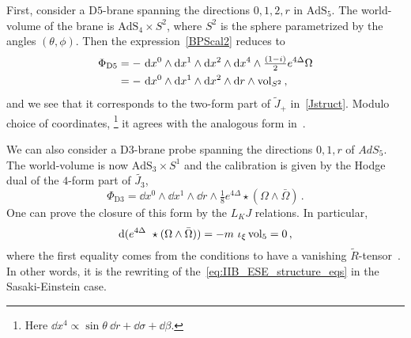 \documentclass[debug]{phd}
\begin{document}
First, consider a D$5$-brane spanning the directions $0,1,2, r$ in $\mathrm{AdS}_5$. 
The world-volume of the brane is $\mathrm{AdS}_4 \times S^2$, where $S^2$ is the sphere parametrized by the angles $(\theta, \phi)$. 
Then the expression~\eqref{BPScal2} reduces to 
%
	\begin{equation} 
		\begin{split}
			\Phi_{\mathrm{D}5} &= -\ \mathrm{d}  x^0 \wedge \mathrm{d}  x^1 \wedge \mathrm{d}  x^2 \wedge \mathrm{d}  x^4 \wedge \tfrac{(1-i)}{2} e^{4\Delta}\Omega \\
				& = -\ \mathrm{d}  x^0 \wedge \mathrm{d}  x^1 \wedge \mathrm{d}  x^2 \wedge \mathrm{d}  r \wedge \operatorname{vol}_{S^2}\, ,
		\end{split}
	\end{equation} 
%
and we see that it corresponds to the two-form part of $\tilde{J}_+$ in~\eqref{Jstruct}.
Modulo choice of coordinates,%
		\footnote{%
		Here $\dd  x^4 \propto \sin \theta\ \dd  r + \dd  \sigma + \dd  \beta$.%
		} it agrees with the analogous form in~\cite{Cascales:2004qp}.

We can also consider a D$3$-brane probe spanning the directions $0,1,r $ of $AdS_5$. 
The world-volume is now $\mathrm{AdS}_3 \times S^1$ and the calibration is given by the Hodge dual of the $4$-form part of $\tilde{J_3}$,
%
	\begin{equation} 
		\Phi_{\mathrm{D}3} = \dd  x^0 \wedge \dd  x^1 \wedge \dd  r \wedge \tfrac{1}{8} e^{4\Delta} \star( \Omega \wedge \bar{\Omega})\, .
	\end{equation} 
%
One can prove the closure of this form by the $L_K J$ relations. In particular,
%
	\begin{equation} 
		\dd  (e^{4\Delta} \star ( \Omega \wedge \bar{\Omega})) = - m\ \iota_\xi \vol_5 = 0\, ,
	\end{equation} 
%
where the first equality comes from the conditions to have a vanishing $\tilde{R}$-tensor~\cite{AshmoreECY,AshmoreESE}. 
In other words, it is the rewriting of the~\eqref{eq:IIB_ESE_structure_eqs} in the Sasaki-Einstein case.


\end{document}

